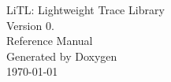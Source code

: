\documentclass{book}
\begin{document}
\hypersetup{pageanchor=false,citecolor=blue}
\begin{titlepage}
\vspace*{7cm}
\begin{center}
{\LARGE LiTL: Lightweight Trace Library }\\[2mm]
{\large Version 0. }\\
\vspace*{1cm}
{\LARGE Reference Manual}\\
\vspace*{1cm}
{\large Generated by Doxygen}\\
\vspace*{0.5cm}
{\today\ \currenttime}\\
\end{center}
\end{titlepage}
\clearemptydoublepage
{}
\tableofcontents
\clearemptydoublepage
{}
\end{document}
